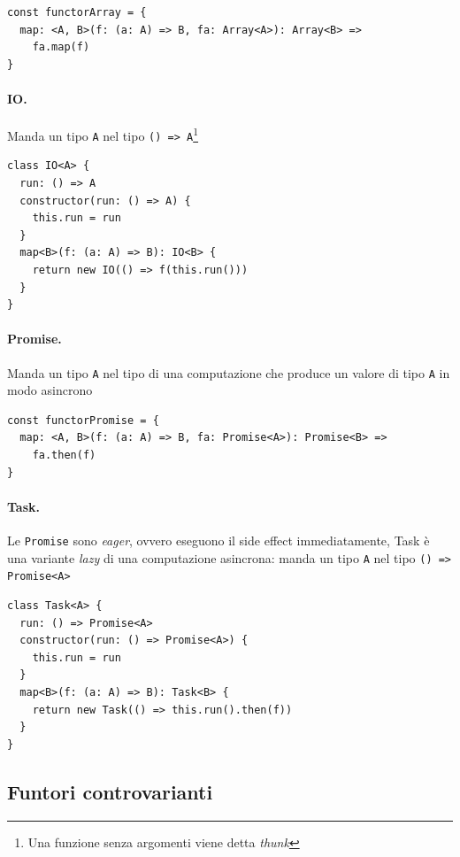 \documentclass[12pt]{article}
\begin{document}
\begin{verbatim}
const functorArray = {
  map: <A, B>(f: (a: A) => B, fa: Array<A>): Array<B> =>
    fa.map(f)
}
\end{verbatim}

\paragraph{IO.}

Manda un tipo \texttt{A} nel tipo \texttt{() => A}\footnote{Una funzione senza argomenti viene detta \emph{thunk}}

\begin{verbatim}
class IO<A> {
  run: () => A
  constructor(run: () => A) {
    this.run = run
  }
  map<B>(f: (a: A) => B): IO<B> {
    return new IO(() => f(this.run()))
  }
}
\end{verbatim}

\paragraph{Promise.}

Manda un tipo \texttt{A} nel tipo di una computazione che produce un valore di tipo \texttt{A} in modo asincrono

\begin{verbatim}
const functorPromise = {
  map: <A, B>(f: (a: A) => B, fa: Promise<A>): Promise<B> =>
    fa.then(f)
}
\end{verbatim}

\paragraph{Task.}

Le \texttt{Promise} sono \emph{eager}, ovvero eseguono il side effect immediatamente, Task è una variante \emph{lazy}
di una computazione asincrona: manda un tipo \texttt{A} nel tipo \texttt{() => Promise<A>}

\begin{verbatim}
class Task<A> {
  run: () => Promise<A>
  constructor(run: () => Promise<A>) {
    this.run = run
  }
  map<B>(f: (a: A) => B): Task<B> {
    return new Task(() => this.run().then(f))
  }
}
\end{verbatim}

\subsection{Funtori controvarianti}
\end{document}
